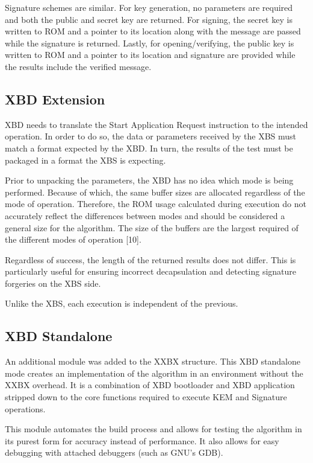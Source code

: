 \documentclass[10pt]{article}
\begin{document}
Signature schemes are similar. For key generation, no parameters are required and both the 
public and secret key are returned. For signing, the secret key is written to ROM and a 
pointer to its location along with the message are passed while the signature is returned. 
Lastly, for opening/verifying, the public key is written to ROM and a pointer to its location 
and signature are provided while the results include the verified message.

\subsection{XBD Extension}
XBD needs to translate the Start Application Request instruction to the intended operation. 
In order to do so, the data or parameters received by the XBS must match a format expected 
by the XBD. In turn, the results of the test must be packaged in a format the XBS is expecting.

Prior to unpacking the parameters, the XBD has no idea which mode is being performed. 
Because of which, the same buffer sizes are allocated regardless of the mode of operation. 
Therefore, the ROM usage calculated during execution do not accurately reflect the differences 
between modes and should be considered a general size for the algorithm. 
The size of the buffers are the largest required of the different modes of operation [10].

Regardless of success, the length of the returned results does not differ. 
This is particularly useful for ensuring incorrect decapsulation and detecting signature 
forgeries on the XBS side.

Unlike the XBS, each execution is independent of the previous.


\subsection{XBD Standalone}
An additional module was added to the XXBX structure. This XBD standalone mode creates 
an implementation of the algorithm in an environment without the XXBX overhead. It is a 
combination of XBD bootloader and XBD application stripped down to the core functions 
required to execute KEM and Signature operations.

This module automates the build process and allows for testing the algorithm in its purest 
form for accuracy instead of performance. It also allows for easy debugging with attached 
debuggers (such as GNU’s GDB).
\end{document}
